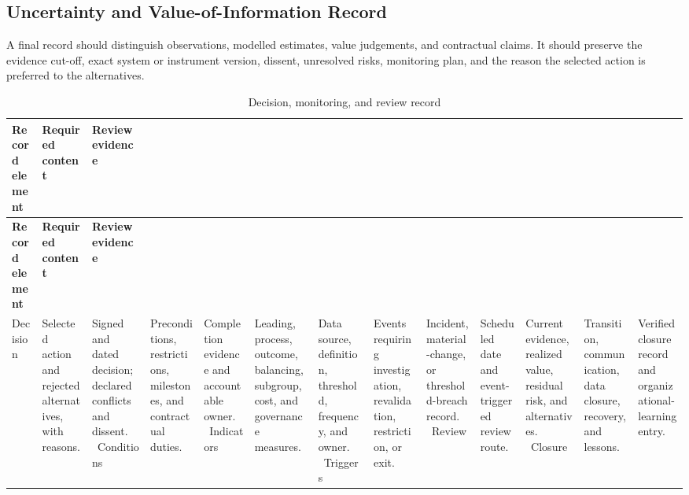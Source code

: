 \subsection{Uncertainty and Value-of-Information Record}
\label{sec:comp-ch08-supp-3}
A final record should distinguish observations, modelled estimates, value
judgements, and contractual claims. It should preserve the evidence cut-off, exact
system or instrument version, dissent, unresolved risks, monitoring plan, and the
reason the selected action is preferred to the alternatives.

\begin{longtable}{@{}p{}p{}p{}@{}}
\caption{Decision, monitoring, and review record}
\label{tab:comp-ch08-decision-record}\\
\toprule
\textbf{Record element} & \textbf{Required content} & \textbf{Review evidence} \\
\midrule
\endfirsthead
\toprule
\textbf{Record element} & \textbf{Required content} & \textbf{Review evidence} \\
\midrule
\endhead
\bottomrule
\endlastfoot
Decision & Selected action and rejected alternatives, with reasons. & Signed and dated decision; declared conflicts and dissent. \
Conditions & Preconditions, restrictions, milestones, and contractual duties. & Completion evidence and accountable owner. \
Indicators & Leading, process, outcome, balancing, subgroup, cost, and governance measures. & Data source, definition, threshold, frequency, and owner. \
Triggers & Events requiring investigation, revalidation, restriction, or exit. & Incident, material-change, or threshold-breach record. \
Review & Scheduled date and event-triggered review route. & Current evidence, realized value, residual risk, and alternatives. \
Closure & Transition, communication, data closure, recovery, and lessons. & Verified closure record and organizational-learning entry. \
\end{longtable}
